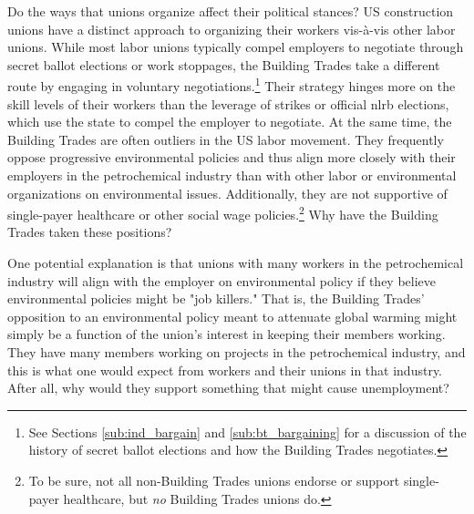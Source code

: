 \documentclass[12pt]{article}
\begin{document}
Do the ways that unions organize affect their political stances? US construction unions have a distinct approach to organizing their workers vis-à-vis other labor unions. While most labor unions typically compel employers to negotiate through secret ballot elections or work stoppages, the Building Trades take a different route by engaging in voluntary negotiations.\footnote{See Sections \ref{sub:ind_bargain} and \ref{sub:bt_bargaining} for a discussion of the history of secret ballot elections and how the Building Trades negotiates.} Their strategy hinges more on the skill levels of their workers than the leverage of strikes or official \acrfull{nlrb} elections, which use the state to compel the employer to negotiate. At the same time, the Building Trades are often outliers in the US labor movement. They frequently oppose progressive environmental policies and thus align more closely with their employers in the petrochemical industry than with other labor or environmental organizations on environmental issues. Additionally, they are not supportive of single-payer healthcare or other social wage policies.\footnote{To be sure, not all non-Building Trades unions endorse or support single-payer healthcare, but \emph{no} Building Trades unions do.} Why have the Building Trades taken these positions?

One potential explanation is that unions with many workers in the petrochemical industry will align with the employer on environmental policy if they believe environmental policies might be "job killers." That is, the Building Trades' opposition to an environmental policy meant to attenuate global warming might simply be a function of the union's interest in keeping their members working. They have many members working on projects in the petrochemical industry, and this is what one would expect from workers and their unions in that industry. After all, why would they support something that might cause unemployment?
\end{document}
